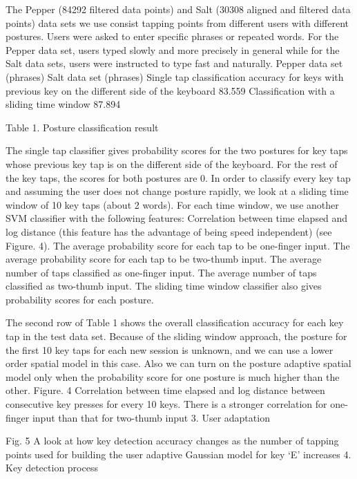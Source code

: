 \documentclass{sigchi}
\begin{document}
The Pepper (84292 filtered data points) and Salt (30308 aligned and filtered data points) data sets we use consist tapping points from different users with different postures. Users were asked to enter specific phrases or repeated words. For the Pepper data set, users typed slowly and more precisely in general while for the Salt data sets, users were instructed to type fast and naturally.
Pepper data set (phrases) Salt data set (phrases)
Single tap classification accuracy for keys with previous key on the different side of the keyboard 83.559%
Classification with a sliding time window 87.894%

Table 1. Posture classification result 

The single tap classifier gives probability scores for the two postures for key taps whose previous key tap is on the different side of the keyboard. For the rest of the key taps, the scores for both postures are 0. In order to classify every key tap and assuming the user does not change posture rapidly, we look at a sliding time window of 10 key taps (about 2 words). For each time window, we use another SVM classifier with the following features:
Correlation between time elapsed and log distance (this feature has the advantage of being speed independent) (see Figure. 4).
The average probability score for each tap to be one-finger input.
The average probability score for each tap to be two-thumb input.
The average number of taps classified as one-finger input.
The average number of taps classified as two-thumb input.
The sliding time window classifier also gives probability scores for each posture.

The second row of Table 1 shows the overall classification accuracy for each key tap in the test data set. Because of the sliding window approach, the posture for the first 10 key taps for each new session is unknown, and we can use a lower order spatial model in this case. Also we can turn on the posture adaptive spatial model only when the probability score for one posture is much higher than the other. 
Figure. 4 Correlation between time elapsed and log distance between consecutive 
key presses for every 10 keys. There is a stronger correlation for one- 
finger input than that for two-thumb input
3. User adaptation

Fig. 5  A look at how key detection accuracy changes as the number of tapping points used for building the user adaptive Gaussian model for key ‘E’ increases
4. Key detection process 
\end{document}
